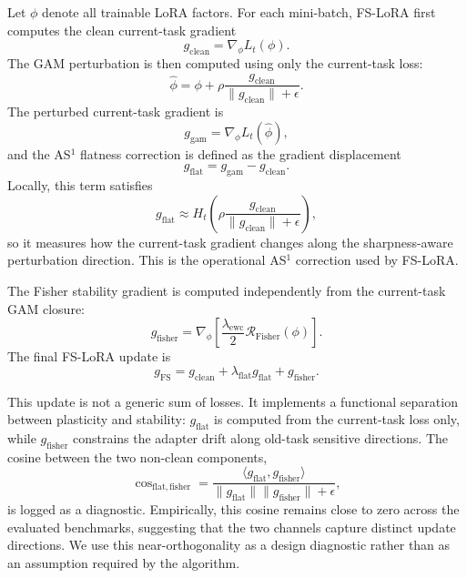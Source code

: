 Let $\phi$ denote all trainable LoRA factors.
For each mini-batch, FS-LoRA first computes the clean current-task gradient
\begin{equation}
g_{\mathrm{clean}}
=
\nabla_{\phi} L_t(\phi).
\label{eq:gclean}
\end{equation}
The GAM perturbation is then computed using only the current-task loss:
\begin{equation}
\hat{\phi}
=
\phi
+
\rho
\frac{
g_{\mathrm{clean}}
}{
\|g_{\mathrm{clean}}\|+\epsilon
}.
\label{eq:task_only_perturb}
\end{equation}
The perturbed current-task gradient is
\begin{equation}
g_{\mathrm{gam}}
=
\nabla_{\phi}L_t(\hat{\phi}),
\label{eq:ggam}
\end{equation}
and the AS$^1$ flatness correction is defined as the gradient displacement
\begin{equation}
g_{\mathrm{flat}}
=
g_{\mathrm{gam}}
-
g_{\mathrm{clean}}.
\label{eq:gflat}
\end{equation}
Locally, this term satisfies
\begin{equation}
g_{\mathrm{flat}}
\approx
H_t
\left(
\rho
\frac{
g_{\mathrm{clean}}
}{
\|g_{\mathrm{clean}}\|+\epsilon
}
\right),
\label{eq:gflat_hessian}
\end{equation}
so it measures how the current-task gradient changes along the sharpness-aware perturbation direction.
This is the operational AS$^1$ correction used by FS-LoRA.

The Fisher stability gradient is computed independently from the current-task GAM closure:
\begin{equation}
g_{\mathrm{fisher}}
=
\nabla_{\phi}
\left[
\frac{\lambda_{\mathrm{ewc}}}{2}
\mathcal R_{\mathrm{Fisher}}(\phi)
\right].
\label{eq:gfisher}
\end{equation}
The final FS-LoRA update is
\begin{equation}
g_{\mathrm{FS}}
=
g_{\mathrm{clean}}
+
\lambda_{\mathrm{flat}}g_{\mathrm{flat}}
+
g_{\mathrm{fisher}}.
\label{eq:gfs}
\end{equation}

This update is not a generic sum of losses.
It implements a functional separation between plasticity and stability: $g_{\mathrm{flat}}$ is computed from the current-task loss only, while $g_{\mathrm{fisher}}$ constrains the adapter drift along old-task sensitive directions.
The cosine between the two non-clean components,
\begin{equation}
\cos_{\mathrm{flat,fisher}}
=
\frac{
\langle g_{\mathrm{flat}},g_{\mathrm{fisher}}\rangle
}{
\|g_{\mathrm{flat}}\|\|g_{\mathrm{fisher}}\|+\epsilon
},
\label{eq:cos_flat_fisher}
\end{equation}
is logged as a diagnostic.
Empirically, this cosine remains close to zero across the evaluated benchmarks, suggesting that the two channels capture distinct update directions.
We use this near-orthogonality as a design diagnostic rather than as an assumption required by the algorithm.

